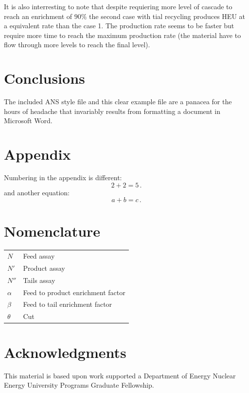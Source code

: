 \documentclass{anstrans}
\begin{document}
It is also interresting to note that despite requiering more level of cascade to
reach an enrichment of $90\%$ the second case with tial recycling produces HEU
at a equivalent rate than the case 1. The production rate seems to be faster but
require more time to reach the maximum production rate (the material have to
flow through more levels to reach the final level).

\section{Conclusions}

The included ANS style file and this clear example file are a panacea for
the hours of headache that invariably results from formatting a document in
Microsoft Word.

\appendix
\section{Appendix}

Numbering in the appendix is different:
\begin{equation} \label{eq:appendix}
  2 + 2 = 5\,.
\end{equation}
and another equation:
\begin{equation} \label{eq:appendix2}
  a + b = c\,.
\end{equation}

\section{Nomenclature}

\begin{table}[H]
    \centering
    \begin{tabular}{l|l}
        $N$ & Feed assay \\
        $N'$ & Product assay \\
        $N''$ & Tails assay \\
        $\alpha$ & Feed to product enrichment factor \\
        $\beta$ & Feed to tail enrichment factor \\
        $\theta$ & Cut
    \end{tabular}
    \label{tab:my_label}
\end{table}

\section{Acknowledgments}
This material is based upon work supported a Department of Energy Nuclear
Energy University Programs Graduate Fellowship.



\end{document}

